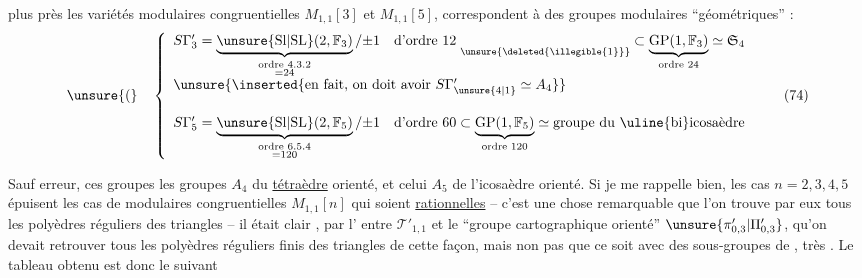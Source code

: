 
plus près les variétés modulaires congruentielles
$M_{1,1}[3]$ et $M_{1,1}[5]$, correspondent à des
groupes modulaires ``géométriques'' :
\[
\unsure{(}\quad
\left\{
\begin{array}{l}
S\Gamma'_3 = \underbrace{\unsure{\mathrm{Sl}|\mathrm{SL}}(2,\mathbb F_3)}_{\substack{\text{ordre }4.3.2\\=24}}/\mathord{\pm}1
\quad \text{d'ordre }12\;\underset{\unsure{\deleted{\illegible{1}}}}{\phantom{a}}
\subset \underbrace{\mathrm{GP}(1,\mathbb F_3)}_{\text{ordre }24}\simeq\mathfrak S_4
\\[1.5em]
\unsure{\inserted{\text{en fait, on doit avoir } S\Gamma'_{\unsure{4|1}}\simeq A_4}}
\\[1.5em]
S\Gamma'_5 = \underbrace{\unsure{\mathrm{Sl}|\mathrm{SL}}(2,\mathbb F_5)}_{\substack{\text{ordre }6.5.4\\=120}}/\mathord{\pm}1
\quad \text{d'ordre }60
\subset \underbrace{\mathrm{GP}(1,\mathbb F_5)}_{\text{ordre }120}\simeq\text{groupe du \uline{bi}icosaèdre}
\end{array}
\right.
\tag{74}
\]

Sauf erreur, ces groupes   les groupes $A_4$ du
\uline{tétraèdre} orienté, et celui $A_5$ de l'icosaèdre
orienté. Si je me rappelle bien, les cas
$n=2,3,4,5$ épuisent les cas de  modulaires
congruentielles $M_{1,1}[n]$ qui soient \uline{rationnelles}
-- c'est une chose remarquable que l'on trouve
par eux tous les polyèdres réguliers   des
triangles  -- il était clair , par l' entre
$\mathcal T'_{1,1}$ et le ``groupe cartographique  orienté'' $\unsure{\pi'_{0,3}|\Pi'_{0,3}}$,
qu'on devait retrouver tous
les polyèdres réguliers finis  des
triangles de cette façon, mais non pas que
ce soit avec des sous-groupes de ,
très . Le tableau obtenu est
donc le suivant


